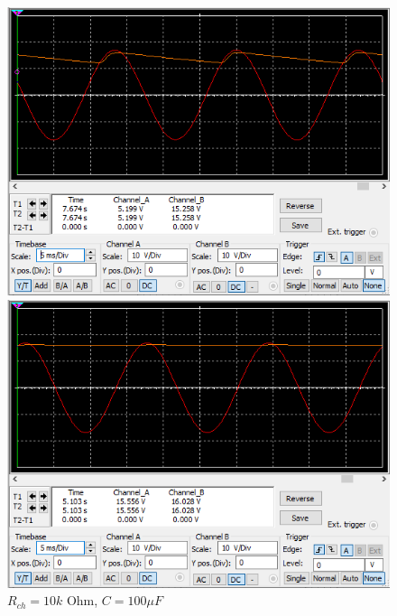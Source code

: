 \documentclass{article}
\begin{document}
\begin{normalsize}
	\begin{figure}[H]
		\begin{minipage}[t]{0.48\textwidth}
			\centering
			\includegraphics[width=\textwidth]{500}
			\caption{$R_{ch}=500\text{ Ohm}$, $C=100\mu F$}
		\end{minipage}
		\hfill
		\begin{minipage}[t]{0.48\textwidth}
			\centering
			\includegraphics[width=\textwidth]{10k}
			\caption{$R_{ch}=10k\text{ Ohm}$, $C=100\mu F$}
		\end{minipage}
	\end{figure}
	

\end{normalsize}
\end{document}
